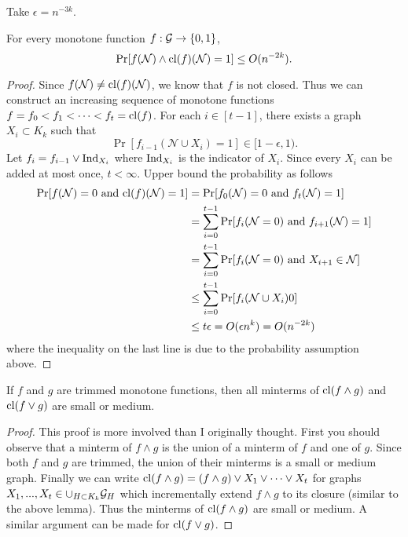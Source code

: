 \documentclass[11pt]{article}
\begin{document}
 	Take $\epsilon = n^{-3k}$. 
 	\begin{lemma}
 		\label{lem:UB-ProbFunctionDiffersFromClosure}
 		For every monotone function $f: \mathcal{G} \rightarrow\{0,1\}$,
 		\[\Pr[f(\mathcal{N}) \land \mathrm{cl}(f)(\mathcal{N}) = 1] \leq O(n^{-2k}).\]
 	\end{lemma}
 	\begin{proof}
 		Since $f(\mathcal{N}) \neq \mathrm{cl}(f)(\mathcal{N})$, we know that $f$ is not closed. Thus we can construct an increasing sequence of monotone functions $f = f_0 < f_1 < \cdots < f_t = \mathrm{cl}(f)$. For each $i \in [t-1]$, there exists a graph $X_i \subset K_k$ such that 
 		\[\Pr[f_{i-1}(\mathcal{N} \cup X_i) = 1] \in [1 - \epsilon, 1).\]
 		Let $f_i = f_{i-1} \lor \mathrm{Ind}_{X_i}$ where $\mathrm{Ind}_{X_i}$ is the indicator of $X_i$. Since every $X_i$ can be added at most once, $t < \infty$. Upper bound the probability as follows
 		\begin{align*}
 			\Pr[f(\mathcal{N}) = 0 \mbox{ and } \mathrm{cl}(f)(\mathcal{N}) = 1] &= \Pr[f_0(\mathcal{N}) = 0 \mbox{ and } f_t(\mathcal{N}) = 1]\\
 			&= \sum_{i = 0}^{t-1}\Pr[f_i(\mathcal{N} = 0) \mbox{ and } f_{i+1}(\mathcal{N}) = 1]\\
 			&= \sum_{i = 0}^{t-1}\Pr[f_i(\mathcal{N} = 0) \mbox{ and } X_{i+1} \in \mathcal{N}]\\
 			&\leq \sum_{i = 0}^{t-1} \Pr[f_{i}(\mathcal{N} \cup X_i) 0]\\
 			&\leq t\epsilon = O(\epsilon n^{k}) = O(n^{-2k})
 		\end{align*}
 		where the inequality on the last line is due to the probability assumption above. 
 	\end{proof}
 	
 	\begin{lemma}
 		\label{lem:BD-SizeMintermsOfTrimmedClosures}
 		If $f$ and $g$ are trimmed monotone functions, then all minterms of $\mathrm{cl}(f \land g)$ and $\mathrm{cl}(f \lor g)$ are small or medium.
 	\end{lemma}
 	\begin{proof}
 		This proof is more involved than I originally thought. First you should observe that a minterm of $f \land g$ is the union of a minterm of $f$ and one of $g$. Since both $f$ and $g$ are trimmed, the union of their minterms is a small or medium graph. Finally we can write $\mathrm{cl}(f \land g) = (f\land g) \lor X_1 \lor \cdots \lor X_t$ for graphs $X_1, ..., X_t \in \cup_{H \subset K_k} \mathcal{G}_{H}$ which incrementally extend $f\land g$ to its closure (similar to the above lemma). Thus the minterms of $\mathrm{cl}(f\land g)$ are small or medium. A similar argument can be made for $\mathrm{cl}(f\lor g)$.
 	\end{proof}
 	
\end{document}
